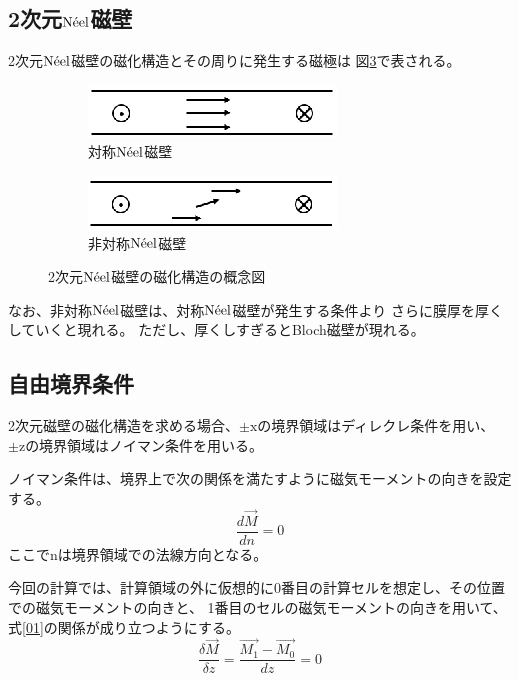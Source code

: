 \documentclass{jsarticle}
\begin{document}
\subsection{2次元$\mathrm{N\Acute{e}el}$磁壁}
2次元$\mathrm{N\Acute{e}el}$磁壁の磁化構造とその周りに発生する磁極は
図\ref{fig02}で表される。
\begin{figure}[H]
	\centering
	\begin{subfigure}{0.49\columnwidth}
		\centering
		\includegraphics[width=\columnwidth]{pic07.eps}
		\caption{対称$\mathrm{N\Acute{e}el}$磁壁}
		\label{fig02_1}
	\end{subfigure}
	\begin{subfigure}{0.49\columnwidth}
		\centering
		\includegraphics[width=\columnwidth]{pic08.eps}
		\caption{非対称$\mathrm{N\Acute{e}el}$磁壁}
		\label{fig02_2}
	\end{subfigure}
	\caption{2次元$\mathrm{N\Acute{e}el}$磁壁の磁化構造の概念図}
	\label{fig02}
\end{figure}

なお、非対称$\mathrm{N\Acute{e}el}$磁壁は、対称$\mathrm{N\Acute{e}el}$磁壁が発生する条件より
さらに膜厚を厚くしていくと現れる。
ただし、厚くしすぎるとBloch磁壁が現れる。

\subsection{自由境界条件}
2次元磁壁の磁化構造を求める場合、$\pm \mathrm{x}$の境界領域はディレクレ条件を用い、
$\pm \mathrm{z}$の境界領域はノイマン条件を用いる。

ノイマン条件は、境界上で次の関係を満たすように磁気モーメントの向きを設定する。
\begin{equation}
	\frac{d\vec{M}}{dn} = 0
\end{equation}
ここでnは境界領域での法線方向となる。

今回の計算では、計算領域の外に仮想的に0番目の計算セルを想定し、その位置での磁気モーメントの向きと、
1番目のセルの磁気モーメントの向きを用いて、式\ref{01}の関係が成り立つようにする。
\begin{equation}
	\frac{\delta \vec{M}}{\delta z} = \frac{\vec{M_1} - \vec{M_0}}{dz} = 0
	\label{01}
\end{equation}
\end{document}
